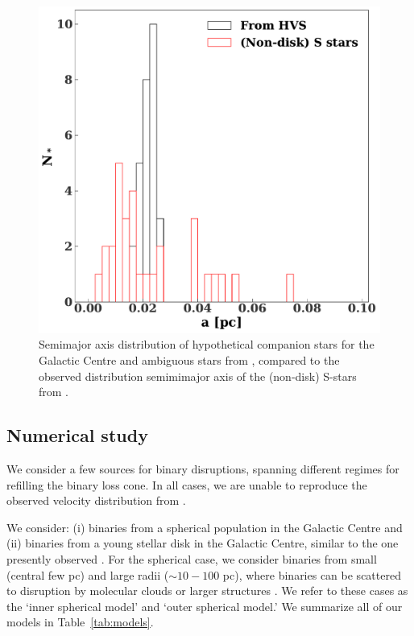\documentclass[fleqn,usenatbib]{mnras}
\begin{document}
\begin{figure}
    \includegraphics[width=\columnwidth]{figures/s_star_comp.pdf}
    \caption{Semimajor axis distribution of hypothetical companion stars for the Galactic Centre and ambiguous stars from \citet{warren_brown+2018}, compared to the observed distribution semimimajor axis of the (non-disk) S-stars from \citet{gillessen+2017}.
    \label{fig:sstarcomp}}
\end{figure}



\subsection{Numerical study}
We consider a few sources for binary disruptions, spanning different regimes for refilling the binary loss cone. In all cases, we are unable to reproduce the observed velocity distribution from \citet{warren_brown+2018}.

We consider: (i) binaries from a  spherical population in the Galactic Centre and (ii) binaries from a young stellar disk in the Galactic Centre, similar to the one presently observed \citep{levin&beloborodov03, paumard+2006}. For the spherical case, we consider binaries from small (central few pc) and large radii ($\sim 10-100$ pc), where binaries can be scattered to disruption by molecular clouds or larger structures \citep{perets+2007,hamers+17}.
We refer to these cases as the `inner spherical model' and `outer spherical model.' We summarize all of our models in Table~\ref{tab:models}.
\end{document}
